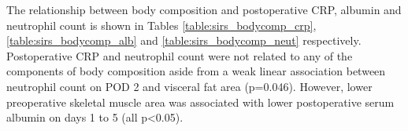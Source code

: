 The relationship between body composition and postoperative CRP, albumin and neutrophil count is shown in Tables \ref{table:sirs_bodycomp_crp}, \ref{table:sirs_bodycomp_alb} and \ref{table:sirs_bodycomp_neut} respectively.
Postoperative CRP and neutrophil count were not related to any of the components of body composition aside from a weak linear association between neutrophil count on POD 2 and visceral fat area (p=0.046).
However, lower preoperative skeletal muscle area was associated with lower postoperative serum albumin on days 1 to 5 (all p<0.05).












\clearpage

